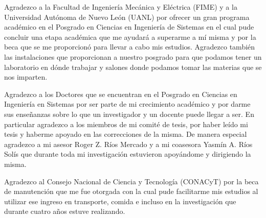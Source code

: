 Agradezco a la Facultad de Ingeniería Mecánica y Eléctrica (FIME) y a la Universidad Autónoma de Nuevo León (UANL) por ofrecer un gran programa a\-ca\-dé\-mi\-co en el Posgrado en Ciencias en Ingeniería de Sistemas en el cual pude concluir una etapa académica que me ayudará a superarme a mí misma y por la beca que se me proporcionó para llevar a cabo mis estudios. Agradezco también las instalaciones que proporcionan a nuestro posgrado para que podamos tener un laboratorio en dónde trabajar y salones donde podamos tomar las materias que se nos imparten.

Agradezco a los Doctores que se encuentran en el Posgrado en Ciencias en Ingeniería en Sistemas por ser parte de mi crecimiento académico y por darme sus enseñanzas sobre lo que un investigador y un docente puede llegar a ser. En particular agradezco a los miembros de mi comité de tesis, por haber leído mi tesis y haberme apoyado en las correcciones de la misma. De manera especial agradezco a mi asesor Roger Z. Ríos Mercado y a mi coasesora Yasmín A. Ríos Solís que durante toda mi investigación estuvieron apoyándome y dirigiendo la misma. 

Agradezco al Consejo Nacional de Ciencia y Tecnología (CONACyT) por la beca de manutención que me fue otorgada con la cual pude facilitarme mis estudios al utilizar ese ingreso en transporte, comida e incluso en la investigación que durante cuatro años estuve realizando. 
